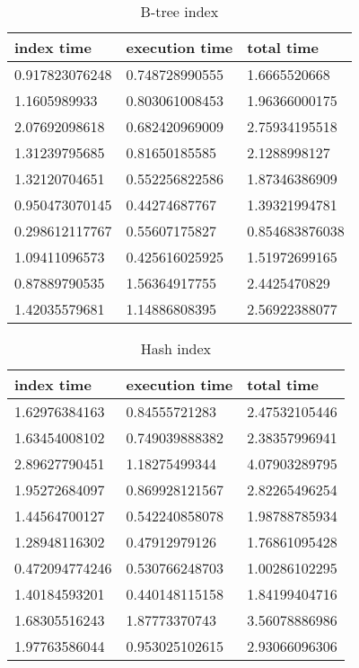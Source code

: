 \begin{itemize*}
\begin{table}[H]
\begin{center}
\begin{tabular}{|l|l|l|}
\hline
index time & execution time & total time                \\ \hline
0.917823076248 & 0.748728990555 & 1.6665520668   \\ \hline
1.1605989933   & 0.803061008453 & 1.96366000175  \\ \hline
2.07692098618  & 0.682420969009 & 2.75934195518  \\ \hline
1.31239795685  & 0.81650185585  & 2.1288998127   \\ \hline
1.32120704651  & 0.552256822586 & 1.87346386909  \\ \hline
0.950473070145 & 0.44274687767  & 1.39321994781  \\ \hline
0.298612117767 & 0.55607175827  & 0.854683876038 \\ \hline
1.09411096573  & 0.425616025925 & 1.51972699165  \\ \hline
0.87889790535  & 1.56364917755  & 2.4425470829   \\ \hline
1.42035579681  & 1.14886808395  & 2.56922388077  \\ \hline
\end{tabular}
\end{center}
\caption{B-tree index}
\end{table}

\begin{table}[H]
\begin{center}
\begin{tabular}{|l|l|l|}
\hline
index time & execution time & total time     \\ \hline
1.62976384163  & 0.84555721283  & 2.47532105446 \\ \hline
1.63454008102  & 0.749039888382 & 2.38357996941 \\ \hline
2.89627790451  & 1.18275499344  & 4.07903289795 \\ \hline
1.95272684097  & 0.869928121567 & 2.82265496254 \\ \hline
1.44564700127  & 0.542240858078 & 1.98788785934 \\ \hline
1.28948116302  & 0.47912979126  & 1.76861095428 \\ \hline
0.472094774246 & 0.530766248703 & 1.00286102295 \\ \hline
1.40184593201  & 0.440148115158 & 1.84199404716 \\ \hline
1.68305516243  & 1.87773370743  & 3.56078886986 \\ \hline
1.97763586044  & 0.953025102615 & 2.93066096306 \\ \hline
\end{tabular}
\end{center}
\caption{Hash index}
\end{table}


\end{itemize*}

